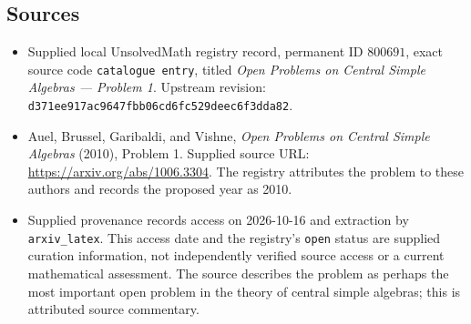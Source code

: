 \documentclass[11pt]{article}
\begin{document}
\subsection{Sources}
\begin{itemize}
\item Supplied local UnsolvedMath registry record, permanent ID \(800691\), exact source code \texttt{catalogue entry}, titled \emph{Open Problems on Central Simple Algebras --- Problem 1}. Upstream revision: \texttt{d371ee917ac9647fbb06cd6fc529deec6f3dda82}.
\item Auel, Brussel, Garibaldi, and Vishne, \emph{Open Problems on Central Simple Algebras} (2010), Problem 1. Supplied source URL: \url{https://arxiv.org/abs/1006.3304}. The registry attributes the problem to these authors and records the proposed year as 2010.
\item Supplied provenance records access on 2026-10-16 and extraction by \texttt{arxiv\_latex}. This access date and the registry's \texttt{open} status are supplied curation information, not independently verified source access or a current mathematical assessment. The source describes the problem as perhaps the most important open problem in the theory of central simple algebras; this is attributed source commentary.
\end{itemize}
\end{document}
